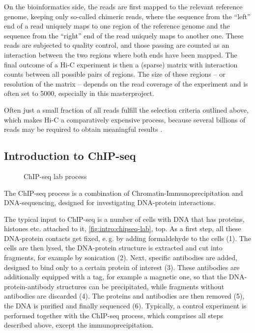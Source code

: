 On the bioinformatics side, the reads are first mapped to the relevant reference genome,
keeping only so-called chimeric reads, where the sequence from the ``left'' end of a read
uniquely maps to one region of the reference genome and the sequence from the ``right'' end 
of the read uniquely maps to another one.
These reads are subjected to quality control, and those passing are counted as an interaction
between the two regions where both ends have been mapped.
The final outcome of a Hi-C experiment is then a (sparse) matrix with interaction counts 
between all possible pairs of regions.
The size of these regions -- or resolution of the matrix -- depends on the read coverage
of the experiment and is often set to \SI{5000}{\bp}, especially in this masterproject.

Often just a small fraction of all reads fulfill the selection criteria outlined above,
which makes Hi-C a comparatively expensive process, because several billions
of reads may be required to obtain meaningful results \cite{Rao2014}.

\clearpage
\subsection{Introduction to ChIP-seq} \label{sec:intro:chipseq}
\begin{wrapfigure}[38]{l}{0.3\textwidth}
 \caption{ChIP-seq lab process}
 \label{fig:intro:chipseq-lab}
\end{wrapfigure}
The ChIP-seq process is a combination of Chromatin-Immunoprecipitation and DNA-sequencing, 
designed for investigating DNA-protein interactions.

The typical input to ChIP-seq is a number of cells with DNA that has proteins, histones etc. attached to
it, \autoref{fig:intro:chipseq-lab}, top. 
As a first step, all these DNA-protein contacts get fixed, 
e.\,g. by adding formaldehyde to the cells (1).
The cells are then lysed, the DNA-protein structure is extracted and cut into fragments, 
for example by sonication (2).
Next, specific antibodies are added, designed to bind only to a certain protein of interest (3).
These antibodies are additionally equipped with a tag, for example a magnetic one, so that 
the DNA-protein-antibody structures can be precipitated, while fragments without antibodies are discarded (4).
The proteins and antibodies are then removed (5), 
the DNA is purified and finally sequenced (6).
Typically, a control experiment is performed together with the ChIP-seq process, 
which comprises all steps described above, except the immunoprecipitation.

